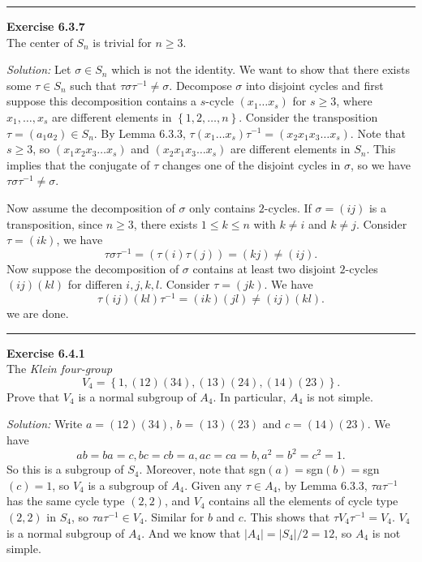 \documentclass[a4paper, 12pt]{article}
\newenvironment{problem}[2][Exercise]
    { \begin{mdframed}[backgroundcolor=gray!20] \textbf{#1 #2} \\}
    {  \end{mdframed}}
\newenvironment{solution}
    {\textit{Solution:}}
    {}
\begin{document}
\noindent\rule{7in}{2.8pt}
\begin{problem}{6.3.7}
The center of \(S_n\) is trivial for \(n\geq 3\).
\end{problem}
\begin{solution}
Let \(\sigma\in S_n\) which is not the identity. We want to show that there exists some \(\tau\in S_n\) such that \(\tau\sigma\tau^{-1}\neq \sigma\). Decompose \(\sigma\) into disjoint cycles and first suppose 
this decomposition contains a \(s\)-cycle \((x_1\ldots x_s)\) for \(s\geq 3\), where \(x_1,\ldots,x_s\) are different elements in \(\left\{ 1,2,\ldots,n \right\}\). Consider the transposition \(\tau=(a_1 a_2)\in S_n\). By Lemma 6.3.3, 
\(\tau(x_1\ldots x_s)\tau^{-1}=(x_2 x_1 x_3\ldots x_s)\). Note that \(s\geq 3\), so \((x_1x_2x_3\ldots x_s)\) and \((x_2x_1x_3\ldots x_s)\) are different elements in \(S_n\). This implies that the conjugate of \(\tau\) changes one of the 
disjoint cycles in \(\sigma\), so we have \(\tau\sigma\tau^{-1}\neq \sigma\).

Now assume the decomposition of \(\sigma\) only contains \(2\)-cycles. If \(\sigma=(ij)\) is a transposition, since \(n\geq 3\), there exists \(1\leq k\leq n\) with \(k\neq i\) and \(k\neq j\). Consider \(\tau=(ik)\), we have 
\[\tau\sigma\tau^{-1}=(\tau(i) \tau(j))=(kj)\neq (ij).\]
Now suppose the decomposition of \(\sigma\) contains at least two disjoint \(2\)-cycles \((ij)(kl)\) for differen \(i,j,k,l\). Consider \(\tau=(jk)\). We have 
\[\tau(ij)(kl)\tau^{-1}=(ik)(jl)\neq (ij)(kl).\]
we are done.
\end{solution}

\noindent\rule{7in}{2.8pt}
\begin{problem}{6.4.1}
The \textit{Klein four-group} 
\[V_4=\left\{ 1,(12)(34),(13)(24),(14)(23) \right\}.\]
Prove that \(V_4\) is a normal subgroup of \(A_4\). In particular, \(A_4\) is not simple.
\end{problem}
\begin{solution}
Write \(a=(12)(34)\), \(b=(13)(23)\) and \(c=(14)(23)\). We have 
\[ab=ba=c,bc=cb=a,ac=ca=b, a^2=b^2=c^2=1.\]
So this is a subgroup of \(S_4\). Moreover, note that sgn\((a)=\)sgn\((b)=\)sgn\((c)=1\), so \(V_4\) is a subgroup of \(A_4\). Given any \(\tau\in A_4\), by Lemma 6.3.3, \(\tau a\tau^{-1}\) has the same cycle type \((2,2)\), and \(V_4\) contains all the elements of cycle type 
\((2,2)\) in \(S_4\), so \(\tau a\tau^{-1}\in V_4\). Similar for \(b\) and \(c\). This shows that \(\tau V_4 \tau^{-1}=V_4\). \(V_4\) is a normal subgroup of \(A_4\). And we know that \(|A_4|=|S_4|/2=12\), so \(A_4\) is not simple.
\end{solution}
\end{document}
